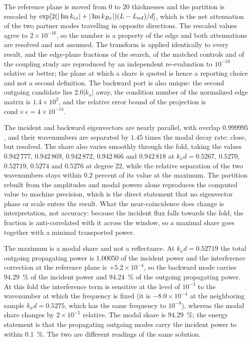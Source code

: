 The reference plane is moved from $0$ to $20$
thicknesses and the partition is rescaled by
$\exp[2(|\operatorname{Im} k_{ix}|+|\operatorname{Im} k_{Bx}|)(L-L_{\text{ref}})/d]$, which is the net
attenuation of the two partner modes travelling in opposite directions.  The
rescaled values agree to $2\times10^{-16}$, so the number is a property of the
edge and both attenuations are resolved and not assumed.  The transform is
applied identically to every result, and the edge-plane
fractions of the search, of the matched controls and of the coupling study
are reproduced by an independent re-evaluation to $10^{-10}$ relative or better; the plane at
which a share is quoted is hence a reporting choice and not a second
definition.  The backward port
is also unique: the second outgoing candidate lies $2.0|k_x|$ away, the
condition number of the normalized edge matrix is $1.4\times10^{2}$, and the
relative error bound of the projection is $\text{cond}\times\epsilon=4\times10^{-14}$.

The incident and backward eigenvectors
are nearly parallel, with overlap $0.999995$, and their wavenumbers are
separated by $1.45$ times the modal decay rate: close, but resolved.  The share also varies smoothly through the fold, taking the values $0.942\,777$, $0.942\,869$, $0.942\,872$, $0.942\,866$ and $0.942\,818$ at $k_xd=0.5267$, $0.5270$, $0.52719$, $0.5274$ and $0.5276$ at degree $22$, while the relative separation of the two wavenumbers stays within $0.2$ percent of its value at the maximum.  The
partition rebuilt from the amplitudes and modal powers alone reproduces the computed value to machine precision, which is the direct statement that no
eigenvector phase or scale enters the result.  What the near-coincidence does
change is interpretation, not accuracy: because the incident flux falls towards
the fold, the fraction is anti-correlated with it across the window, so a maximal share goes together with a minimal transported power.

The maximum is a modal share and not a reflectance.  At $k_xd=0.52719$ the
total outgoing propagating power is $1.00050$ of the incident power and the
interference correction at the reference plane is $+5.2\times10^{-4}$, so the
backward mode carries \SI{94.29}{\percent} of the incident power and
\SI{94.24}{\percent} of the outgoing propagating power.  At this fold the
interference term is sensitive at the level of $10^{-3}$ to the wavenumber at which the
frequency is fixed (it is $-8.0\times10^{-4}$ at the neighboring sample $k_xd=0.5275$, which has the same frequency to $10^{-8}$), whereas the modal share changes by $2\times10^{-5}$ relative.  The modal share is
\SI{94.29}{\percent}; the energy statement is that the propagating outgoing
modes carry the incident power to within \SI{0.1}{\percent}.  The two are different readings of the same
solution.

